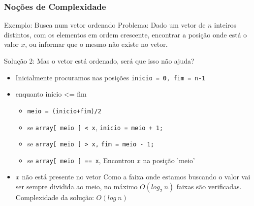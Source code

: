 \begin{frame}
\frametitle{Noções de Complexidade}

\begin{block}{Exemplo: Busca num vetor ordenado}
Problema: Dado um vetor de $n$ inteiros distintos, com os elementos em ordem crescente,
encontrar a posição onde está o valor $x$, ou informar que o mesmo não existe no vetor.\\
\end{block}
\begin{block}{Solução 2:}
Mas o vetor está ordenado, será que isso não ajuda?
{
\begin{itemize}
\tiny
	\item[] Inicialmente procuramos nas posições \texttt{inicio = 0, fim = n-1}
	\item[] enquanto inicio <= fim
	\begin{itemize}
\tiny
		\item[] \texttt{meio = (inicio+fim)/2}
		\item[] se \texttt{array[ meio ] < x}, \texttt{inicio = meio + 1;}
		\item[] se \texttt{array[ meio ] > x,} \texttt{fim = meio - 1;}
		\item[] se \texttt{array[ meio ] == x}, Encontrou $x$ na posição 'meio' 
	\end{itemize}
	\item[] $x$ não está presente no vetor
\normalsize
	\bitem<3-> Como a faixa onde estamos buscando o valor vai ser sempre dividida ao meio, no máximo $O(log_2\ n)$ faixas são verificadas.
	\bitem<3-> Complexidade da solução: $O(log\ n)$
\end{itemize}
}
\end{block}

\end{frame}




